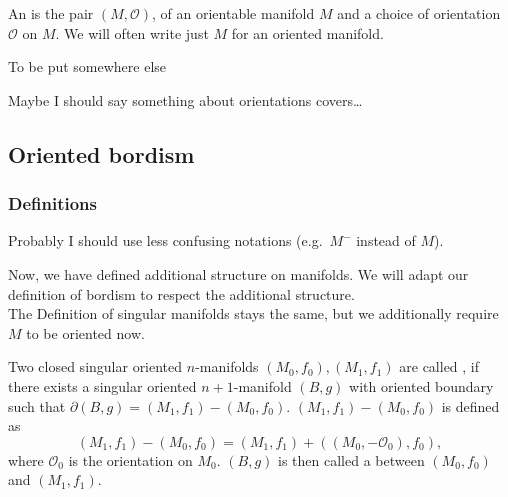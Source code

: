 \documentclass[a4paper,11pt]{article}
\begin{document}
\begin{definition}
\end{definition}

\begin{definition}
\end{definition}

\begin{definition}
    An  is the pair \((M,\mathcal{O})\), of an orientable manifold \(M\) and a choice of orientation \(\mathcal{O}\) on \(M\).
    We will often write just \(M\) for an oriented manifold.
\end{definition}

\begin{definition}
    To be put somewhere else
\end{definition}

Maybe I should say something about orientations covers\dots

\subsection{Oriented bordism}

\subsubsection{Definitions}
Probably I should use less confusing notations (e.g.\ \(M^-\) instead of \(M\)).

Now, we have defined additional structure on manifolds.
We will adapt our definition of bordism to respect the additional structure.\\
The Definition of singular manifolds stays the same, but we additionally require \(M\) to be oriented now.

\begin{definition}
    Two closed singular oriented \(n\)-manifolds \((M_0,f_0),(M_1,f_1)\) are called , if there exists a singular oriented \(n+1\)-manifold \((B,g)\) with oriented boundary such that \(\partial (B,g) = (M_1,f_1)-(M_0,f_0)\). \((M_1,f_1)-(M_0,f_0)\) is defined as
    \[(M_1,f_1)-(M_0,f_0)=(M_1,f_1)+((M_0,-\mathcal{O}_0),f_0),\]
    where \(\mathcal{O}_0\) is the orientation on \(M_0\). \((B,g)\) is then called a  between \((M_0,f_0)\) and \((M_1,f_1)\).
\end{definition}
\end{document}
